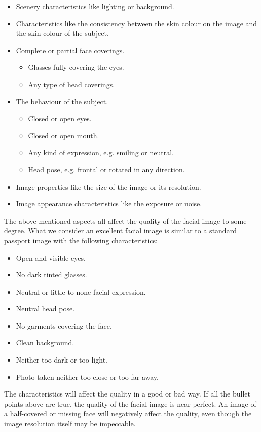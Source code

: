 \begin{itemize}
    \item Scenery characteristics like lighting or background.
    \item Characteristics like the consistency between the skin colour on the image and the skin colour of the subject.
    \item Complete or partial face coverings.
    \begin{itemize}
        \item Glasses fully covering the eyes.
        \item Any type of head coverings.
    \end{itemize}
    \item The behaviour of the subject.
    \begin{itemize}
        \item Closed or open eyes.
        \item Closed or open mouth.
        \item Any kind of expression, e.g. smiling or neutral.
        \item Head pose, e.g. frontal or rotated in any direction.
    \end{itemize}
    \item Image properties like the size of the image or its resolution.
    \item Image appearance characteristics like the exposure or noise.
\end{itemize}

The above mentioned aspects all affect the quality of the facial image to some degree. What we consider an excellent facial image is similar to a standard passport image with the following characteristics: 
\begin{itemize}
    \item Open and visible eyes.
    \item No dark tinted glasses. 
    \item Neutral or little to none facial expression.
    \item Neutral head pose.
    \item No garments covering the face.
    \item Clean background.
    \item Neither too dark or too light.
    \item Photo taken neither too close or too far away.
\end{itemize}

The characteristics will affect the quality in a good or bad way. If all the bullet points above are true, the quality of the facial image is near perfect. An image of a half-covered or missing face will negatively affect the quality, even though the image resolution itself may be impeccable. 

